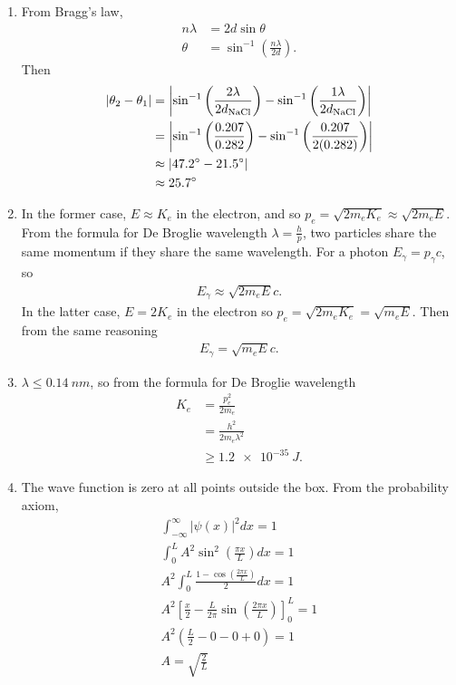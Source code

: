 \documentclass[a4paper,12pt]{article}
\begin{document}
\begin{enumerate}
    \item
        From Bragg's law,
        \begin{align*}
            n \lambda &= 2d \sin\theta \\
            \theta &= \sin^{-1} \left( \frac{n \lambda}{2d} \right).
        \end{align*}
        Then
        \begin{align*}
            |\theta_2 - \theta_1| &= \left| \sin^{-1} \left( \frac{2 \lambda}{2 d_{\text{NaCl}}} \right) - \sin^{-1} \left( \frac{1 \lambda}{2 d_{\text{NaCl}}} \right) \right| \\
            &= \left| \sin^{-1} \left( \frac{0.207}{0.282} \right) - \sin^{-1} \left( \frac{0.207}{2(0.282)} \right) \right| \\
            &\approx |47.2\degree - 21.5\degree| \\
            &\approx 25.7\degree
        \end{align*}

    \item
        In the former case, $E \approx K_e$ in the electron, and so $p_e = \sqrt{2m_eK_e} \approx \sqrt{2m_eE}$. From the formula for De Broglie wavelength $\lambda = \frac{h}{p}$, two particles share the same momentum if they share the same wavelength. For a photon $E_\gamma = p_\gamma c$, so
        \begin{align*}
            E_\gamma \approx \sqrt{2m_eE}c.
        \end{align*}
        In the latter case, $E = 2K_e$ in the electron so $p_e = \sqrt{2m_eK_e} = \sqrt{m_eE}$. Then from the same reasoning
        \begin{align*}
            E_\gamma = \sqrt{m_eE}c.
        \end{align*}

    \item
        $\lambda \leq \SI{0.14}{nm}$, so from the formula for De Broglie wavelength
        \begin{align*}
            K_e &= \frac{p_e^2}{2m_e} \\
            &= \frac{h^2}{2m_e \lambda^2} \\
            &\geq \SI{1.2e-35}{J}.
        \end{align*}

    \item
        The wave function is zero at all points outside the box. From the probability axiom,
        \begin{gather*}
            \int_{-\infty}^\infty |\psi(x)|^2 dx = 1 \\
            \int_0^L A^2 \sin^2 \left( \frac{\pi x}{L} \right) dx = 1 \\
            A^2 \int_0^L \frac{1 - \cos(\frac{2\pi x}{L})}{2} dx = 1 \\
            A^2 \left[ \frac{x}{2} - \frac{L}{2\pi} \sin \left( \frac{2 \pi x}{L} \right) \right]_0^L = 1 \\
            A^2 \left( \frac{L}{2} - 0 - 0 + 0 \right) = 1 \\
            A = \sqrt{\frac{2}{L}}
        \end{gather*}


\end{enumerate}
\end{document}
